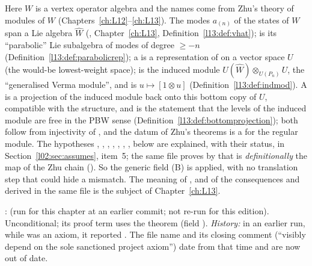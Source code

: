 \begin{dictionary}
Here $W$ is a vertex operator algebra and the names come from Zhu's theory of modules of $W$
(Chapters~\ref{ch:L12}--\ref{ch:L13}). The modes $a_{(n)}$ of the states of $W$ span a Lie algebra $\hat W$
(, Chapter~\ref{ch:L13}, Definition~\ref{l13:def:vhat});  is its ``parabolic'' Lie subalgebra of
modes of degree $\ge -n$ (Definition~\ref{l13:def:parabolicrep}); a  is a representation
 of  on a vector space $U$ (the would-be lowest-weight space);  is the
induced module $U(\hat W)\otimes_{U(P_n)}U$, the ``generalised Verma module'', and  is
$u\mapsto[1\otimes u]$ (Definition~\ref{l13:def:indmod}). A  is a projection of the induced
module back onto this bottom copy of $U$, compatible with the structure, and  is the
statement that the levels of the induced module are free in the PBW sense
(Definition~\ref{l13:def:bottomprojection}); both follow from injectivity of , and the datum
 of Zhu's theorems is a  for the regular module. The hypotheses
, , , , , , ,  below are
explained, with their status, in Section~\ref{l02:sec:assumes}, item~5; the same file proves by  that
 is \emph{definitionally} the map  of the
Zhu chain (\allowbreak{}). So the generic field (B) is applied, with no translation
step that could hide a mismatch. The meaning of ,  and of the
consequences  and \allowbreak{} derived in the same file is the
subject of Chapter~\ref{ch:L13}.
\end{dictionary}

\begin{status}
\allowbreak{}\allowbreak{}\allowbreak{}\allowbreak{}: 
(run for this chapter at an earlier commit; not re-run for this edition). Unconditional; its proof term uses the theorem  (field ).
\emph{History:} in an earlier run, while  was an axiom, it reported . The file
name  and its closing comment (``visibly depend on the sole
sanctioned project axiom'') date from that time and are now out of date.
\end{status}

